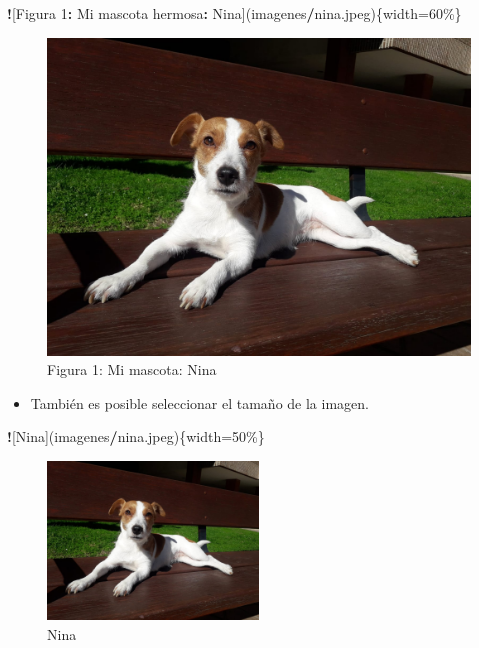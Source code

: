 \documentclass[
]{article}
\newenvironment{Shaded}{\begin{snugshade}}{\end{snugshade}}
\newcommand{\DecValTok}[1]{\textcolor[rgb]{0.00,0.00,0.81}{#1}}
\newcommand{\NormalTok}[1]{#1}
\newcommand{\OtherTok}[1]{\textcolor[rgb]{0.56,0.35,0.01}{#1}}
\newcommand{\SpecialCharTok}[1]{\textcolor[rgb]{0.81,0.36,0.00}{\textbf{#1}}}
\providecommand{\tightlist}{%
  \setlength{\itemsep}{0pt}\setlength{\parskip}{0pt}}
\begin{document}
\begin{Shaded}
\begin{Highlighting}[]
\SpecialCharTok{!}\NormalTok{[Figura }\DecValTok{1}\SpecialCharTok{:}\NormalTok{ Mi mascota hermosa}\SpecialCharTok{:}\NormalTok{ Nina](imagenes}\SpecialCharTok{/}\NormalTok{nina.jpeg)\{width}\OtherTok{=}\DecValTok{60}\NormalTok{\%\}}
\end{Highlighting}
\end{Shaded}

\begin{figure}
\centering
\includegraphics{imagenes/nina.jpeg}
\caption{Figura 1: Mi mascota: Nina}
\end{figure}

\begin{itemize}
\tightlist
\item
  También es posible seleccionar el tamaño de la imagen.
\end{itemize}

\begin{Shaded}
\begin{Highlighting}[]
\SpecialCharTok{!}\NormalTok{[Nina](imagenes}\SpecialCharTok{/}\NormalTok{nina.jpeg)\{width}\OtherTok{=}\DecValTok{50}\NormalTok{\%\}}
\end{Highlighting}
\end{Shaded}

\begin{figure}
\centering
\includegraphics[width=0.5\textwidth,height=\textheight]{imagenes/nina.jpeg}
\caption{Nina}
\end{figure}
\end{document}
